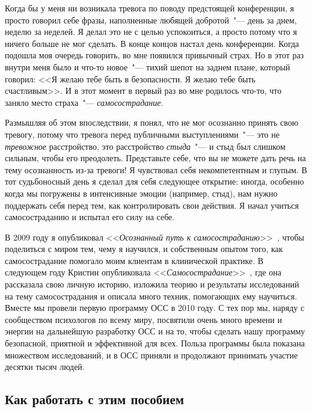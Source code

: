 	Когда бы у меня ни возникала тревога по поводу предстоящей конференции, я просто говорил себе фразы, наполненные любящей добротой~"--- день за днем, неделю за неделей. Я делал это не с целью успокоиться, а просто потому что я ничего больше не мог сделать. В конце концов настал день конференции. Когда подошла моя очередь говорить, во мне появился привычный страх. Но в этот раз внутри меня было и что-то новое~"--- тихий шепот на заднем плане, который говорил: <<Я желаю тебе быть в безопасности. Я желаю тебе быть счастливым>>. И в этот момент в первый раз во мне родилось что-то, что заняло место страха~"--- \emph{самосострадание}.
	
	Размышляя об этом впоследствии, я понял, что не мог осознанно принять свою тревогу, потому что тревога перед публичными выступлениями~"--- это не \emph{тревожное} расстройство, это расстройство \emph{стыда}~"--- и стыд был слишком сильным, чтобы его преодолеть. Представьте себе, что вы не можете дать речь на тему осознанность из-за тревоги! Я чувствовал себя некомпетентным и глупым. В тот судьбоносный день я сделал для себя следующее открытие: иногда, особенно когда мы погружены в интенсивные эмоции (например, стыд), нам нужно поддержать себя перед тем, как контролировать свои действия. Я начал учиться самосостраданию и испытал его силу на себе.
	
	В 2009 году я опубликовал <<\emph{Осознанный путь к самосостраданию}>>~\cite{19}, чтобы поделиться с миром тем, чему я научился, и собственным опытом того, как самосострадание помогало моим клиентам в клинической практике. В следующем году Кристин опубликовала <<\emph{Самосострадание}>>~\cite{20}, где она рассказала свою личную историю, изложила теорию и результаты исследований на тему самосострадания и описала много техник, помогающих ему научиться. Вместе мы провели первую программу ОСС в 2010 году. С тех пор мы, наряду с сообществом психологов по всему миру, посвятили очень много времени и энергии на дальнейшую разработку ОСС и на то, чтобы сделать нашу программу безопасной, приятной и эффективной для всех. Польза программы была показана множеством исследований, и в ОСС приняли и продолжают принимать участие десятки тысяч людей. 
	
	
	\subsection*{Как работать с этим пособием}
	
